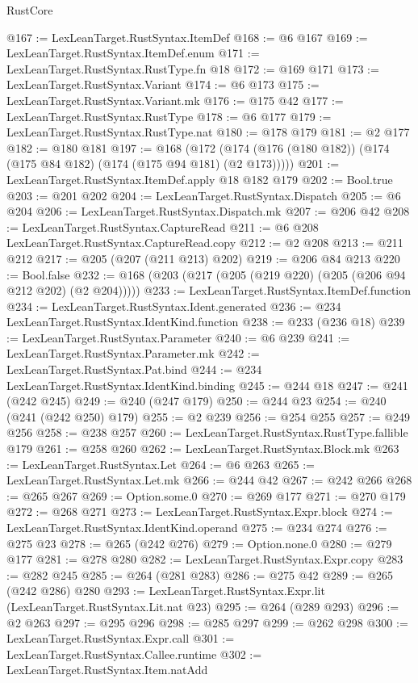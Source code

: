 \begin{lexlean}{RustCore}
\begin{coremodule}
{\begin{coremodule}
{{{{{{{{{@167 := LexLeanTarget.RustSyntax.ItemDef
@168 := @6 @167
@169 := LexLeanTarget.RustSyntax.ItemDef.enum
@171 := LexLeanTarget.RustSyntax.RustType.fn @18
@172 := @169 @171
@173 := LexLeanTarget.RustSyntax.Variant
@174 := @6 @173
@175 := LexLeanTarget.RustSyntax.Variant.mk
@176 := @175 @42
@177 := LexLeanTarget.RustSyntax.RustType
@178 := @6 @177
@179 := LexLeanTarget.RustSyntax.RustType.nat
@180 := @178 @179
@181 := @2 @177
@182 := @180 @181
@197 := @168
    (@172 (@174 (@176 (@180 @182)) (@174 (@175 @84 @182) (@174 (@175 @94 @181) (@2 @173)))))
@201 := LexLeanTarget.RustSyntax.ItemDef.apply @18 @182 @179
@202 := Bool.true
@203 := @201 @202
@204 := LexLeanTarget.RustSyntax.Dispatch
@205 := @6 @204
@206 := LexLeanTarget.RustSyntax.Dispatch.mk
@207 := @206 @42
@208 := LexLeanTarget.RustSyntax.CaptureRead
@211 := @6 @208 LexLeanTarget.RustSyntax.CaptureRead.copy
@212 := @2 @208
@213 := @211 @212
@217 := @205 (@207 (@211 @213) @202)
@219 := @206 @84 @213
@220 := Bool.false
@232 := @168 (@203 (@217 (@205 (@219 @220) (@205 (@206 @94 @212 @202) (@2 @204)))))
@233 := LexLeanTarget.RustSyntax.ItemDef.function
@234 := LexLeanTarget.RustSyntax.Ident.generated
@236 := @234 LexLeanTarget.RustSyntax.IdentKind.function
@238 := @233 (@236 @18)
@239 := LexLeanTarget.RustSyntax.Parameter
@240 := @6 @239
@241 := LexLeanTarget.RustSyntax.Parameter.mk
@242 := LexLeanTarget.RustSyntax.Pat.bind
@244 := @234 LexLeanTarget.RustSyntax.IdentKind.binding
@245 := @244 @18
@247 := @241 (@242 @245)
@249 := @240 (@247 @179)
@250 := @244 @23
@254 := @240 (@241 (@242 @250) @179)
@255 := @2 @239
@256 := @254 @255
@257 := @249 @256
@258 := @238 @257
@260 := LexLeanTarget.RustSyntax.RustType.fallible @179
@261 := @258 @260
@262 := LexLeanTarget.RustSyntax.Block.mk
@263 := LexLeanTarget.RustSyntax.Let
@264 := @6 @263
@265 := LexLeanTarget.RustSyntax.Let.mk
@266 := @244 @42
@267 := @242 @266
@268 := @265 @267
@269 := Option.some.{0}
@270 := @269 @177
@271 := @270 @179
@272 := @268 @271
@273 := LexLeanTarget.RustSyntax.Expr.block
@274 := LexLeanTarget.RustSyntax.IdentKind.operand
@275 := @234 @274
@276 := @275 @23
@278 := @265 (@242 @276)
@279 := Option.none.{0}
@280 := @279 @177
@281 := @278 @280
@282 := LexLeanTarget.RustSyntax.Expr.copy
@283 := @282 @245
@285 := @264 (@281 @283)
@286 := @275 @42
@289 := @265 (@242 @286) @280
@293 := LexLeanTarget.RustSyntax.Expr.lit (LexLeanTarget.RustSyntax.Lit.nat @23)
@295 := @264 (@289 @293)
@296 := @2 @263
@297 := @295 @296
@298 := @285 @297
@299 := @262 @298
@300 := LexLeanTarget.RustSyntax.Expr.call
@301 := LexLeanTarget.RustSyntax.Callee.runtime
@302 := LexLeanTarget.RustSyntax.Item.natAdd
}}}}}}}}}
\end{coremodule}}
\end{coremodule}
\end{lexlean}
